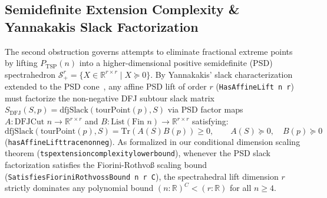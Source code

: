 \documentclass[11pt,a4paper]{article}
\renewcommand{\_}{\origunderscore\allowbreak}
\theoremstyle{plain}
\theoremstyle{definition}
\theoremstyle{remark}
\begin{document}
\subsection{Semidefinite Extension Complexity \& Yannakakis Slack Factorization}
The second obstruction governs attempts to eliminate fractional extreme points by lifting $P_{\text{TSP}}(n)$ into a higher-dimensional positive semidefinite (PSD) spectrahedron $\mathcal{S}_+^r = \{ X \in \mathbb{R}^{r \times r} \mid X \succeq 0 \}$. By Yannakakis' slack characterization~\cite{yannakakis1991} extended to the PSD cone~\cite{fiorini2012,rothvoss2014}, any affine PSD lift of order $r$ (\texttt{HasAffineLift n r}) must factorize the non-negative DFJ subtour slack matrix $S_{\text{DFJ}}(S, p) = \text{dfjSlack}(\text{tourPoint}(p), S)$ via PSD factor maps $A : \text{DFJCut } n \to \mathbb{R}^{r \times r}$ and $B : \text{List}(\text{Fin } n) \to \mathbb{R}^{r \times r}$ satisfying:
\begin{equation}
  \text{dfjSlack}(\text{tourPoint}(p), S) = \text{Tr}(A(S) B(p)) \ge 0, \qquad A(S) \succeq 0, \quad B(p) \succeq 0
\end{equation}
(\texttt{hasAffineLift\_trace\_nonneg}). As formalized in our conditional dimension scaling theorem (\texttt{tsp\_extension\_complexity\_lower\_bound}), whenever the PSD slack factorization satisfies the Fiorini-Rothvo\ss{} scaling bound (\texttt{Satisfies\allowbreak Fiorini\allowbreak Rothvoss\allowbreak Bound n r C}), the spectrahedral lift dimension $r$ strictly dominates any polynomial bound $(n : \mathbb{R})^C < (r : \mathbb{R})$ for all $n \ge 4$.
\end{document}
